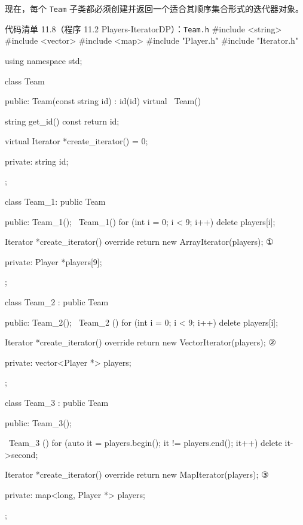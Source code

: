 \par
{}\par
{}\par
{}\par
{}\par
{}\par
{}\par

现在，每个 \texttt{Team} 子类都必须创建并返回一个适合其顺序集合形式的迭代器对象。

\begin{codeboxt}{代码清单 11.8（程序 11.2 Players-IteratorDP）：\texttt{Team.h}}
#include <string>
#include <vector>
#include <map>
#include "Player.h"
#include "Iterator.h"

using namespace std;

class Team
{
public:
    Team(const string id) : id(id) {}
    virtual ~Team() {}

    string get_id() const { return id; }

    virtual Iterator *create_iterator() = 0;

private:
    string id;
};

class Team_1: public Team
{
public:
    Team_1();
    ~Team_1() { for (int i = 0; i < 9; i++) delete players[i]; }

    Iterator *create_iterator() override
    {
        return new ArrayIterator(players);   ①
    }

private:
    Player *players[9];
};

class Team_2 : public Team
{
public:
    Team_2();
    ~Team_2 () { for (int i = 0; i < 9; i++) delete players[i]; }

    Iterator *create_iterator() override
    {
        return new VectorIterator(players);  ②
    }

private:
    vector<Player *> players;
};

class Team_3 : public Team
{
public:
    Team_3();

    ~Team_3 ()
    {
        for (auto it = players.begin(); it != players.end(); it++)
        {
            delete it->second;
        }
    }

    Iterator *create_iterator() override
    {
        return new MapIterator(players);     ③
    }

private:
    map<long, Player *> players;
};
\end{codeboxt}
\par
{}\par
{}\par

